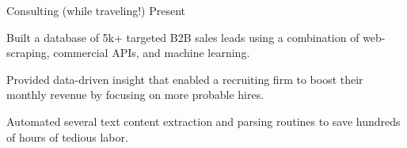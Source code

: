 
\begin{cventries}

  \cventrynew
	{Consulting (while traveling!)}    
    {Present} 
    {}
    {
    \begin{cvitems}
		 \item {Built a database of 5k+ targeted B2B sales leads using a combination of web-scraping, commercial APIs, and machine learning.}
		 \item {Provided data-driven insight that enabled a recruiting firm to boost their monthly revenue by focusing on more probable hires.}		 
		 \item {Automated several text content extraction and parsing routines to save hundreds of hours of tedious labor.}
      \end{cvitems}
    } 


\end{cventries}

